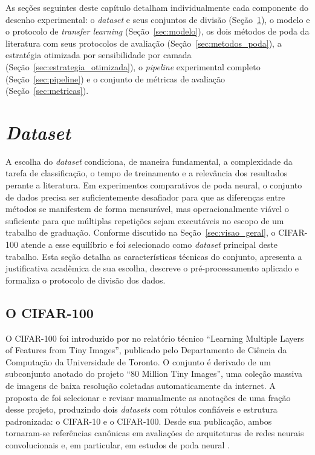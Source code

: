 As seções seguintes deste capítulo detalham individualmente cada componente do desenho experimental: o \textit{dataset} e seus conjuntos de divisão (Seção~\ref{sec:dataset}), o modelo e o protocolo de \textit{transfer learning} (Seção~\ref{sec:modelo}), os dois métodos de poda da literatura com seus protocolos de avaliação (Seção~\ref{sec:metodos_poda}), a estratégia otimizada por sensibilidade por camada (Seção~\ref{sec:estrategia_otimizada}), o \textit{pipeline} experimental completo (Seção~\ref{sec:pipeline}) e o conjunto de métricas de avaliação (Seção~\ref{sec:metricas}).

\section{\textit{Dataset}}\label{sec:dataset}

A escolha do \textit{dataset} condiciona, de maneira fundamental, a complexidade da tarefa de classificação, o tempo de treinamento e a relevância dos resultados perante a literatura. Em experimentos comparativos de poda neural, o conjunto de dados precisa ser suficientemente desafiador para que as diferenças entre métodos se manifestem de forma mensurável, mas operacionalmente viável o suficiente para que múltiplas repetições sejam executáveis no escopo de um trabalho de graduação. Conforme discutido na Seção~\ref{sec:visao_geral}, o CIFAR-100 atende a esse equilíbrio e foi selecionado como \textit{dataset} principal deste trabalho. Esta seção detalha as características técnicas do conjunto, apresenta a justificativa acadêmica de sua escolha, descreve o pré-processamento aplicado e formaliza o protocolo de divisão dos dados.

\subsection{O CIFAR-100}\label{subsec:cifar100}

O CIFAR-100 foi introduzido por  no relatório técnico ``Learning Multiple Layers of Features from Tiny Images'', publicado pelo Departamento de Ciência da Computação da Universidade de Toronto. O conjunto é derivado de um subconjunto anotado do projeto ``80 Million Tiny Images'', uma coleção massiva de imagens de baixa resolução coletadas automaticamente da internet. A proposta de  foi selecionar e revisar manualmente as anotações de uma fração desse projeto, produzindo dois \textit{datasets} com rótulos confiáveis e estrutura padronizada: o CIFAR-10 e o CIFAR-100. Desde sua publicação, ambos tornaram-se referências canônicas em avaliações de arquiteturas de redes neurais convolucionais \cite{He2016, Krizhevsky2012} e, em particular, em estudos de poda neural \cite{Han2015, Li2017, Frankle2019, Blalock2020}.


